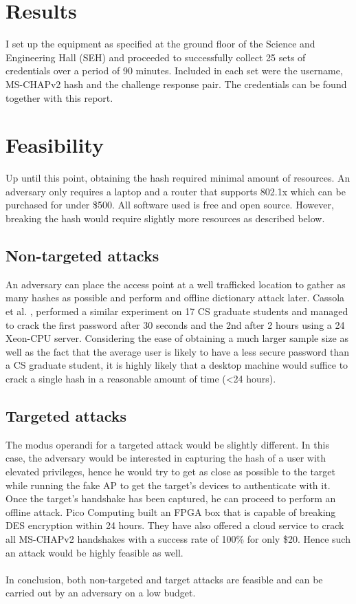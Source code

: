 \documentclass[twoside]{article}
\begin{document}
\begin{multicols}{2}
\section{Results}

I set up the equipment as specified at the ground floor of the Science and Engineering Hall (SEH) and proceeded to successfully collect 25 sets of credentials over a period of 90 minutes. Included in each set were the username, MS-CHAPv2 hash and the challenge response pair. The credentials can be found together with this report.



\section{Feasibility}

Up until this point, obtaining the hash required minimal amount of resources. An adversary only requires a laptop and a router that supports 802.1x which can be purchased for under \$500. All software used is free and open source. However, breaking the hash would require slightly more resources as described below.

\subsection{Non-targeted attacks}

An adversary can place the access point at a well trafficked location to gather as many hashes as possible and perform and offline dictionary attack later. Cassola et al. \cite{5}, performed a similar experiment on 17 CS graduate students and managed to crack the first password after 30 seconds and the 2nd after 2 hours using a 24 Xeon-CPU server. Considering the ease of obtaining a much larger sample size as well as the fact that the average user is likely to have a less secure password than a CS graduate student, it is highly likely that a desktop machine would suffice to crack a single hash in a reasonable amount of time (<24 hours).

\subsection{Targeted attacks}

The modus operandi for a targeted attack would be slightly different. In this case, the adversary would be interested in capturing the hash of a user with elevated privileges, hence he would try to get as close as possible to the target while running the fake AP to get the target's devices to authenticate with it. Once the target's handshake has been captured, he can proceed to perform an offline attack. Pico Computing\cite{6} built an FPGA box that is capable of breaking DES encryption within 24 hours. They have also offered a cloud service to crack all MS-CHAPv2 handshakes with a success rate of 100\% for only \$20. Hence such an attack would be highly feasible as well.
~\\
\\In conclusion, both non-targeted and target attacks are feasible and can be carried out by an adversary on a low budget.





\end{multicols}
\end{document}
